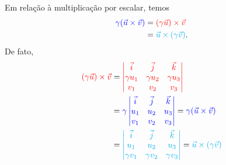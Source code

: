 Em relação à multiplicação por escalar, temos
\begin{align}
  {\color{blue}\gamma(\vec{u}\times\vec{v})} &= {\color{red}(\gamma\vec{u})\times\vec{v}} \\
                              &= {\color{cyan}\vec{u}\times(\gamma\vec{v})}.
\end{align}
De fato,
\begin{align}
  {\color{red}(\gamma\vec{u})\times\vec{v}} &=
                                {\color{red}\begin{vmatrix}
                                  \vec{i} & \vec{j} & \vec{k} \\
                                  \gamma u_1 & \gamma u_2 & \gamma u_3\\
                                  v_1 & v_2 & v_3
                                \end{vmatrix}} \\
                              &= {\color{blue}\gamma\begin{vmatrix}
                                  \vec{i} & \vec{j} & \vec{k} \\
                                  u_1 & u_2 & u_3\\
                                  v_1 & v_2 & v_3
                                \end{vmatrix}} = {\color{blue}\gamma(\vec{u}\times\vec{v})}\\
                              &=
                                {\color{cyan}\begin{vmatrix}
                                  \vec{i} & \vec{j} & \vec{k} \\
                                  u_1 & u_2 & u_3\\
                                  \gamma v_1 & \gamma v_2 & \gamma v_3
                                \end{vmatrix}} = {\color{cyan}\vec{u}\times(\gamma\vec{v})}
\end{align}

